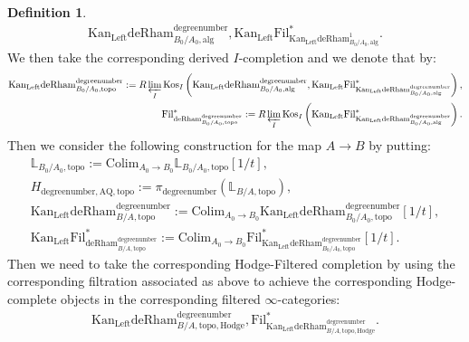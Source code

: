 \documentclass[11pt]{book}
\theoremstyle{definition}
\newtheorem{definition}[theorem]{Definition}
\numberwithin{equation}{section}
\begin{document}
\begin{definition}
\begin{align}
\mathrm{Kan}_\mathrm{Left}\mathrm{deRham}^\text{degreenumber}_{B_0/A_0,\mathrm{alg}},\mathrm{Kan}_\mathrm{Left}\mathrm{Fil}^*_{\mathrm{Kan}_\mathrm{Left}\mathrm{deRham}^1_{B_0/A_0,\mathrm{alg}}}.	
\end{align}
We then take the corresponding derived $I$-completion and we denote that by:
\begin{align}
\mathrm{Kan}_\mathrm{Left}\mathrm{deRham}^\text{degreenumber}_{B_0/A_0,\mathrm{topo}}:=R\varprojlim_I\mathrm{Kos}_I\left(\mathrm{Kan}_\mathrm{Left}\mathrm{deRham}^\text{degreenumber}_{B_0/A_0,\mathrm{alg}},\mathrm{Kan}_\mathrm{Left}\mathrm{Fil}^*_{\mathrm{Kan}_\mathrm{Left}\mathrm{deRham}^\text{degreenumber}_{B_0/A_0,\mathrm{alg}}}\right),\\
\mathrm{Fil}^*_{\mathrm{deRham}^\text{degreenumber}_{B_0/A_0,\mathrm{topo}}}:=R\varprojlim_I\mathrm{Kos}_I\left(\mathrm{Kan}_\mathrm{Left}\mathrm{Fil}^*_{\mathrm{Kan}_\mathrm{Left}\mathrm{deRham}^\text{degreenumber}_{B_0/A_0,\mathrm{alg}}}\right).	
\end{align}
Then we consider the following construction for the map $A\rightarrow B$ by putting:
\begin{align}
\mathbb{L}_{B_0/A_0,\mathrm{topo}}:= \mathrm{Colim}_{A_0\rightarrow B_0}\mathbb{L}_{B_0/A_0,\mathrm{topo}}[1/t],\\
H_{\text{degreenumber},{\mathrm{AQ}},\mathrm{topo}}:=\pi_\text{degreenumber} (\mathbb{L}_{B/A,\mathrm{topo}}),	\\
\mathrm{Kan}_\mathrm{Left}\mathrm{deRham}^\text{degreenumber}_{B/A,\mathrm{topo}}:=\mathrm{Colim}_{A_0\rightarrow B_0}\mathrm{Kan}_\mathrm{Left}\mathrm{deRham}^\text{degreenumber}_{B_0/A_0,\mathrm{topo}}[1/t],\\
\mathrm{Kan}_\mathrm{Left}\mathrm{Fil}^*_{\mathrm{deRham}^\text{degreenumber}_{B/A,\mathrm{topo}}}:=\mathrm{Colim}_{A_0\rightarrow B_0}\mathrm{Fil}^*_{\mathrm{Kan}_\mathrm{Left}\mathrm{deRham}^\text{degreenumber}_{B_0/A_0,\mathrm{topo}}}[1/t].
\end{align}
Then we need to take the corresponding Hodge-Filtered completion by using the corresponding filtration associated as above to achieve the corresponding Hodge-complete objects in the corresponding filtered $\infty$-categories:
\begin{align}
\mathrm{Kan}_\mathrm{Left}{\mathrm{deRham}}^\text{degreenumber}_{B/A,\mathrm{topo,Hodge}},\mathrm{Fil}^*_{\mathrm{Kan}_\mathrm{Left}{\mathrm{deRham}}^\text{degreenumber}_{B/A,\mathrm{topo,Hodge}}}.	
\end{align}
\end{definition}
\end{document}
